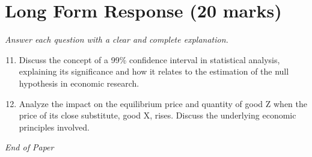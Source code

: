 \documentclass[12pt]{article}
\begin{document}
\section*{Long Form Response (20 marks)}
\textit{Answer each question with a clear and complete explanation.}
\begin{enumerate}[label=\arabic*.]
\setcounter{enumi}{10}
\item Discuss the concept of a 99\% confidence interval in statistical analysis, explaining its significance and how it relates to the estimation of the null hypothesis in economic research.
\item Analyze the impact on the equilibrium price and quantity of good Z when the price of its close substitute, good X, rises. Discuss the underlying economic principles involved.
\end{enumerate}

\vfill
\noindent\textit{End of Paper}
\end{document}
